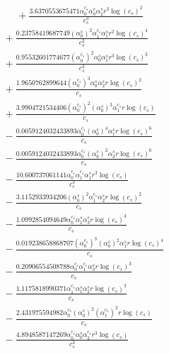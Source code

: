 \documentclass[10pt]{article}
\begin{document}
\begin{align*}
\phantom{R_{0,8}} &\phantom{={}}{}  + \frac{3.6370553675471 \alpha_{0}^{c_s} \alpha_{0}^s \alpha_{2}^s r^{3} \log{\left(c_{s} \right)}^{2}}{c_{s}^{3}} \\
&{}  + \frac{0.23758419687749 \left(\alpha_{0}^s\right)^{2} \alpha_{1}^{c_s} \alpha_{1}^s r^{2} \log{\left(c_{s} \right)}^{4}}{c_{s}^{2}} \\
&{}  + \frac{0.95532601774677 \left(\alpha_{0}^{c_s}\right)^{2} \alpha_{0}^s \alpha_{1}^s r^{3} \log{\left(c_{s} \right)}^{3}}{c_{s}^{3}} \\
&{}  + \frac{1.9650762899644 \left(\alpha_{0}^{c_s}\right)^{3} \alpha_{0}^s \alpha_{2}^s r \log{\left(c_{s} \right)}^{2}}{c_{s}} \\
&{}  + \frac{3.9904721534406 \left(\alpha_{0}^{c_s}\right)^{2} \left(\alpha_{0}^s\right)^{3} \alpha_{1}^{c_s} r \log{\left(c_{s} \right)}}{c_{s}} \\
&{}  - \frac{0.0059124032433893 \alpha_{0}^{c_s} \left(\alpha_{0}^s\right)^{4} \alpha_{1}^s r \log{\left(c_{s} \right)}^{6}}{c_{s}} \\
&{}  - \frac{0.0059124032433893 \alpha_{0}^{c_s} \left(\alpha_{0}^s\right)^{2} \alpha_{3}^s r \log{\left(c_{s} \right)}^{6}}{c_{s}} \\
&{}  - \frac{10.600737061141 \alpha_{0}^{c_s} \alpha_{1}^{c_s} \alpha_{1}^s r^{3} \log{\left(c_{s} \right)}}{c_{s}^{3}} \\
&{}  - \frac{3.1152933934206 \left(\alpha_{0}^s\right)^{2} \alpha_{1}^{c_s} \alpha_{2}^s r \log{\left(c_{s} \right)}^{2}}{c_{s}} \\
&{}  - \frac{1.0992854094649 \alpha_{0}^{c_s} \alpha_{1}^s \alpha_{3}^s r \log{\left(c_{s} \right)}^{3}}{c_{s}} \\
&{}  - \frac{0.019238658868707 \left(\alpha_{0}^{c_s}\right)^{3} \left(\alpha_{0}^s\right)^{2} \alpha_{1}^s r \log{\left(c_{s} \right)}^{4}}{c_{s}} \\
&{}  - \frac{0.20906554508788 \alpha_{0}^{c_s} \alpha_{1}^{c_s} \alpha_{3}^s r \log{\left(c_{s} \right)}^{3}}{c_{s}} \\
&{}  - \frac{1.1175818990371 \alpha_{1}^{c_s} \alpha_{1}^s \alpha_{2}^s r \log{\left(c_{s} \right)}^{3}}{c_{s}} \\
&{}  - \frac{2.431975594982 \alpha_{0}^{c_s} \left(\alpha_{0}^s\right)^{2} \left(\alpha_{1}^{c_s}\right)^{2} r \log{\left(c_{s} \right)}}{c_{s}} \\
&{}  - \frac{4.8948587147269 \alpha_{0}^{c_s} \alpha_{0}^s \alpha_{2}^{c_s} r^{3} \log{\left(c_{s} \right)}}{c_{s}^{3}} \\

\end{align*}
\end{document}
